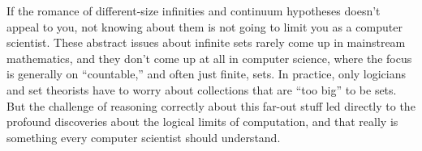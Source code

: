 \documentclass{article}
\begin{document}
    \vspace{1mm}
    \qquad If the romance of different-size infinities and continuum hypotheses doesn't appeal to you, not knowing about them is not going to limit you as a computer scientist. These abstract issues about infinite sets rarely come up in mainstream mathematics, and they don’t come up at all in computer science, where the focus is generally on “countable,” and often just finite, sets. In practice, only logicians and set theorists have to worry about collections that are “too big” to be sets. But the challenge of reasoning correctly about this far-out stuff led directly to the profound discoveries about the logical limits of computation, and that really is something every computer scientist should understand.
\end{document}
